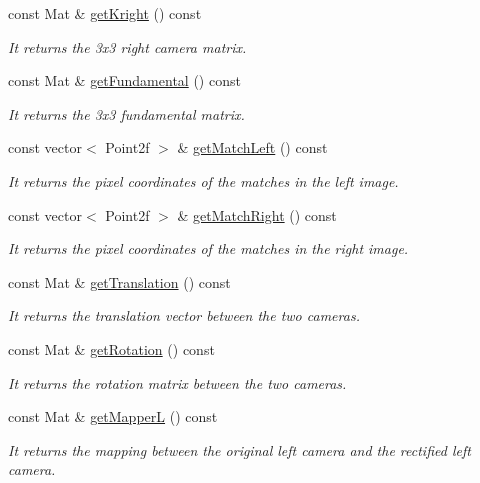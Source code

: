 \begin{DoxyCompactItemize}
const Mat \& \mbox{\hyperlink{classStereoCamera_a6f9e53e949b77cd19e28a4ec92034a3d}{get\+Kright}} () const
\begin{DoxyCompactList}\small\item\em It returns the 3x3 right camera matrix. \end{DoxyCompactList}\item 
const Mat \& \mbox{\hyperlink{classStereoCamera_ab02e0869a054fe23d2b56def81a1a947}{get\+Fundamental}} () const
\begin{DoxyCompactList}\small\item\em It returns the 3x3 fundamental matrix. \end{DoxyCompactList}\item 
const vector$<$ Point2f $>$ \& \mbox{\hyperlink{classStereoCamera_aa50cb648f92d099e1ffbb7bab57c3fc3}{get\+Match\+Left}} () const
\begin{DoxyCompactList}\small\item\em It returns the pixel coordinates of the matches in the left image. \end{DoxyCompactList}\item 
const vector$<$ Point2f $>$ \& \mbox{\hyperlink{classStereoCamera_ac8b01bc577cc3de8e7e8bc246d5c50f0}{get\+Match\+Right}} () const
\begin{DoxyCompactList}\small\item\em It returns the pixel coordinates of the matches in the right image. \end{DoxyCompactList}\item 
const Mat \& \mbox{\hyperlink{classStereoCamera_a3ca6d46fc45835bff5fa0a5753ca40c0}{get\+Translation}} () const
\begin{DoxyCompactList}\small\item\em It returns the translation vector between the two cameras. \end{DoxyCompactList}\item 
const Mat \& \mbox{\hyperlink{classStereoCamera_a08b520f9976fc3213047844fedc02a54}{get\+Rotation}} () const
\begin{DoxyCompactList}\small\item\em It returns the rotation matrix between the two cameras. \end{DoxyCompactList}\item 
const Mat \& \mbox{\hyperlink{classStereoCamera_ae1c7ef2cc1a3de5d10c6bb39fbb78719}{get\+MapperL}} () const
\begin{DoxyCompactList}\small\item\em It returns the mapping between the original left camera and the rectified left camera. \end{DoxyCompactList}\item 

\end{DoxyCompactItemize}
